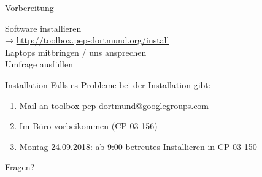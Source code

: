 \begin{frame}{Vorbereitung}
  \begin{center}
    \huge
    Software installieren\\[0.5\baselineskip]
    → \textcolor{blue!70!black}{\url{http://toolbox.pep-dortmund.org/install}}\\[0.5\baselineskip]
    Laptops mitbringen / uns ansprechen\\[0.5\baselineskip]
    Umfrage ausfüllen
  \end{center}
\end{frame}
\begin{frame}{Installation}
  \huge
  Falls es Probleme bei der Installation gibt:\\[0.5\baselineskip]
  \begin{enumerate}
    \item Mail an \href{mailto:toolbox-pep-dortmund@googlegroups.com}{toolbox-pep-dortmund@googlegroups.com}
    \item Im Büro vorbeikommen (CP-03-156)
    \item Montag 24.09.2018: ab 9:00 betreutes Installieren in CP-03-150
  \end{enumerate}
\end{frame}
\begin{frame}
  \Huge\centering
  \textcolor{red!70!black}{Fragen?}
\end{frame}

